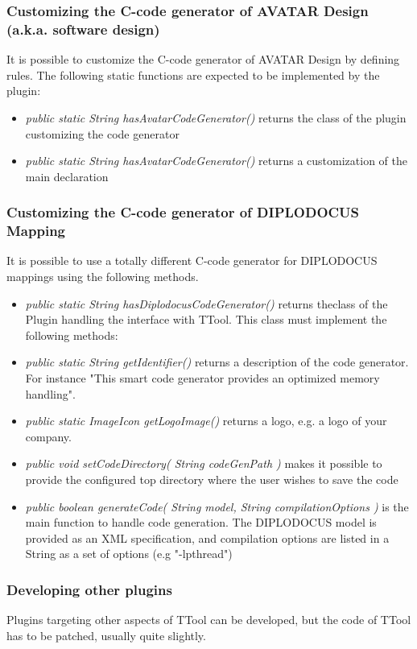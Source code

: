 \documentclass[12pt]{article}
\begin{document}
\subsubsection{Customizing the C-code generator of AVATAR Design (a.k.a. software design)}
It is possible to customize the C-code generator of AVATAR Design by defining rules. The following static functions are expected to be implemented by the plugin:
\begin{itemize}
\item \textit{public  static String hasAvatarCodeGenerator()} returns the class of the plugin customizing the code generator
\item \textit{public static String hasAvatarCodeGenerator()} returns a customization of the main declaration
\end{itemize}

\subsubsection{Customizing the C-code generator of DIPLODOCUS Mapping}
It is possible to use a totally different C-code generator for DIPLODOCUS mappings using the following  methods.
\begin{itemize}
\item \textit{public static String hasDiplodocusCodeGenerator()} returns theclass of the Plugin handling the interface with TTool. This class must implement the following methods:
\item \textit{public static String getIdentifier()} returns a description of the code generator. For instance "This smart code generator provides an optimized memory handling".
\item \textit{public static ImageIcon getLogoImage()} returns a logo, e.g. a logo of your company.
\item \textit{public void setCodeDirectory( String codeGenPath )} makes it possible to provide the configured top directory where the user wishes to save the code
\item \textit{public boolean generateCode( String model, String compilationOptions ) } is the main function to handle code generation. The DIPLODOCUS model is provided as an XML specification, and compilation options are listed in a String as a set of options (e.g "-lpthread") 
\end{itemize}

\subsubsection{Developing other plugins}
Plugins targeting other aspects of TTool can be developed, but the code of TTool has to be patched, usually quite slightly.
\end{document}
